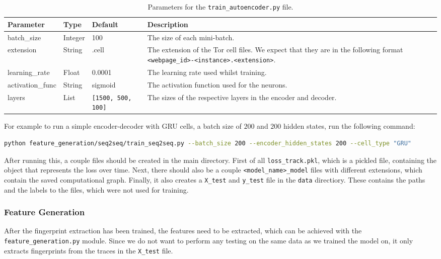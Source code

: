 \begin{table}[ht]
  \centering
  \begin{tabular}{ l | l | l | p{} }
    \textbf{Parameter} & \textbf{Type} & \textbf{Default} & \textbf{Description} \\ \hline \hline
    batch\_size & Integer & 100 & The size of each mini-batch. \\ \hline
    extension & String & .cell & The extension of the Tor cell files. We expect that they are in the following format \texttt{<webpage\_id>-<instance>.<extension>}. \\ \hline
    learning\_rate & Float & 0.0001 & The learning rate used whilst training. \\ \hline
    activation\_func & String & sigmoid & The activation function used for the neurons. \\ \hline
    layers & List & \texttt{[1500, 500, 100]} & The sizes of the respective layers in the encoder and decoder.
  \end{tabular}
  \caption{Parameters for the \texttt{train\_autoencoder.py} file.}
\end{table}

\noindent
For example to run a simple encoder-decoder with GRU cells, a batch size of $200$ and $200$ hidden states, run the following command:
\begin{lstlisting}[language=Bash]
python feature_generation/seq2seq/train_seq2seq.py --batch_size 200 --encoder_hidden_states 200 --cell_type "GRU"
\end{lstlisting}

After running this, a couple files should be created in the main directory.
First of all \texttt{loss\_track.pkl}, which is a pickled file, containing the object that represents the loss over time.
Next, there should also be a couple \texttt{<model\_name>\_model} files with different extensions, which contain the saved computational graph.
Finally, it also creates a \texttt{X\_test} and \texttt{y\_test} file in the \texttt{data} directiory.
These contains the paths and the labels to the files, which were not used for training.

\newpage

\subsubsection{Feature Generation}

After the fingerprint extraction has been trained, the features need to be extracted, which can be achieved with the \texttt{feature\_generation.py} module.
Since we do not want to perform any testing on the same data as we trained the model on, it only extracts fingerprints from the traces in the \texttt{X\_test} file.

